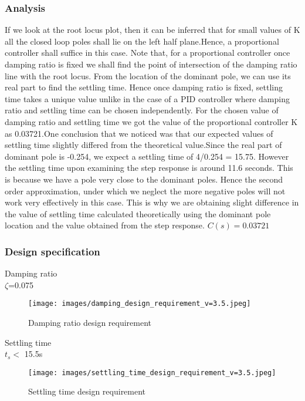 \documentclass[notitlepage]{article}
\begin{document}
\subsubsection{Analysis}
\small If we look at the root locus plot, then it can be inferred that for small values of K all the closed loop poles shall lie on the left half plane.Hence, a proportional controller shall suffice in this case. Note that, for a proportional controller once damping ratio is fixed we shall find the point of intersection of the damping ratio line with the root locus. From the location of the dominant pole, we can use its real part to find the settling time. Hence once damping ratio is fixed, settling time takes a unique value unlike in the case of a PID controller where damping ratio and settling time can be chosen independently.
\small For the chosen value of damping ratio and settling time we got the value of the proportional controller K as 0.03721.One conclusion that we noticed was that our expected values of settling time slightly differed from the theoretical value.Since the real part of dominant pole is -0.254, we expect a settling time of 4/0.254 = 15.75. However the settling time upon examining the step response is around 11.6 seconds. This is because we have a pole very close to the dominant poles. Hence the second order approximation, under which we neglect the more negative poles will not work very effectively in this case. This is why we are obtaining slight difference in the value of settling time calculated theoretically using the dominant pole location and the value obtained from the step response.
\vspace{3mm}
$C(s) = 0.03721$
\pagebreak
\subsubsection{Design specification}
\begin{center}
Damping ratio\\
$\zeta$=0.075
\end{center}

     



\begin{figure}[h!]
    \centering
    \texttt{[image: images/damping\_design\_requirement\_v=3.5.jpeg]}
     \caption{Damping ratio design requirement}
     \label{fig:my_label}
 \end{figure}
\pagebreak
\begin{center}
Settling time\\
\small $t_s  <$ 15.5s
\end{center}
 \begin{figure}[h!]
    \centering
    \texttt{[image: images/settling\_time\_design\_requirement\_v=3.5.jpeg]}
     \caption{Settling time design requirement}
     \label{fig:my_label}
 \end{figure}
\pagebreak
\end{document}
